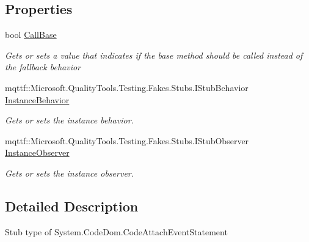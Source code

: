 \subsection*{Properties}
\begin{DoxyCompactItemize}
\item 
bool \hyperlink{class_system_1_1_code_dom_1_1_fakes_1_1_stub_code_attach_event_statement_a83fdc7a0bec4572c8424bac54f4e6a10}{Call\-Base}
\begin{DoxyCompactList}\small\item\em Gets or sets a value that indicates if the base method should be called instead of the fallback behavior\end{DoxyCompactList}\item 
mqttf\-::\-Microsoft.\-Quality\-Tools.\-Testing.\-Fakes.\-Stubs.\-I\-Stub\-Behavior \hyperlink{class_system_1_1_code_dom_1_1_fakes_1_1_stub_code_attach_event_statement_acab4c3af702a139d2d0eb6e4cadd3ae5}{Instance\-Behavior}
\begin{DoxyCompactList}\small\item\em Gets or sets the instance behavior.\end{DoxyCompactList}\item 
mqttf\-::\-Microsoft.\-Quality\-Tools.\-Testing.\-Fakes.\-Stubs.\-I\-Stub\-Observer \hyperlink{class_system_1_1_code_dom_1_1_fakes_1_1_stub_code_attach_event_statement_a12fe160e1c6baa87db94668a1d0b787e}{Instance\-Observer}
\begin{DoxyCompactList}\small\item\em Gets or sets the instance observer.\end{DoxyCompactList}\end{DoxyCompactItemize}


\subsection{Detailed Description}
Stub type of System.\-Code\-Dom.\-Code\-Attach\-Event\-Statement



